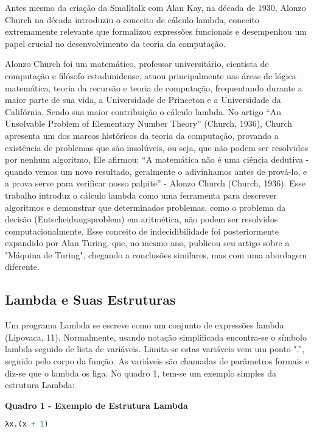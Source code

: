 Antes mesmo da criação da Smalltalk com Alan Kay, na década de 1930, Alonzo Church na década introduziu o conceito de cálculo lambda, conceito extremamente relevante que formalizou expressões funcionais e desempenhou um papel crucial no desenvolvimento da teoria da computação.

 Alonzo Church foi um matemático, professor universitário, cientista de computação e filósofo estadunidense, atuou principalmente nas áreas de lógica matemática, teoria da recursão e teoria de computação, frequentando durante a maior parte de sua vida, a Universidade de Princeton e a Universidade da Califórnia. Sendo sua maior contribuição o cálculo lambda. No artigo “An Unsolvable Problem of Elementary Number Theory” (Church, 1936), Church apresenta um dos marcos históricos da teoria da computação, provando a existência de problemas que são insolúveis, ou seja, que não podem ser resolvidos por nenhum algoritmo, Ele afirmou: “A matemática não é uma ciência dedutiva - quando vemos um novo resultado, geralmente o adivinhamos antes de prová-lo, e a prova serve para verificar nosso palpite” - Alonzo Church (Church, 1936). Esse trabalho introduz o cálculo lambda como uma ferramenta para descrever algoritmos e demonstrar que determinados problemas, como o problema da decisão (Entscheidungsproblem) em aritmética, não podem ser resolvidos computacionalmente. Esse conceito de indecidibilidade foi posteriormente expandido por Alan Turing, que, no mesmo ano, publicou seu artigo sobre a "Máquina de Turing", chegando a conclusões similares, mas com uma abordagem diferente.

\subsection{Lambda e Suas Estruturas}

Um programa Lambda se escreve como um conjunto de expressões lambda (Lipovaca, 11). Normalmente, usando notação simplificada encontra-se o símbolo lambda seguido de lista de variáveis. Limita-se estas variáveis vem um ponto ".'', seguido pelo corpo da função. As variáveis são chamadas de parâmetros formais e diz-se que o lambda os liga. No quadro 1, tem-se um exemplo simples da estrutura Lambda:

\begin{center}
    \textbf{Quadro 1 - Exemplo de Estrutura Lambda} %
\end{center}

\begin{tcolorbox}[colback=gray!5!white, colframe=gray!75!black]
\begin{lstlisting}[language=Lisp]
λx.(x + 1)
\end{lstlisting}
\end{tcolorbox}

